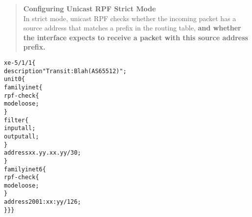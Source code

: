 \documentclass[Screen16to9,17pt]{foils}
\begin{document}








\begin{quote}
{\bf Configuring Unicast RPF Strict Mode}\\
In strict mode, unicast RPF checks whether the incoming packet has a source address that matches a prefix in the routing table, {\bf and whether the interface expects to receive a packet with this source address prefix.}
\end{quote}



\begin{alltt}\footnotesize
xe-5/1/1 \{
    description "Transit: Blah (AS65512)";
    unit 0 \{
        family inet \{
            rpf-check \{
                mode loose;
            \}
            filter \{
                input all;
                output all;
            \}
            address xx.yy.xx.yy/30;
        \}
        family inet6 \{
            rpf-check \{
                mode loose;
            \}
            address 2001:xx:yy/126;
\} \} \}
\end{alltt}
\end{document}
